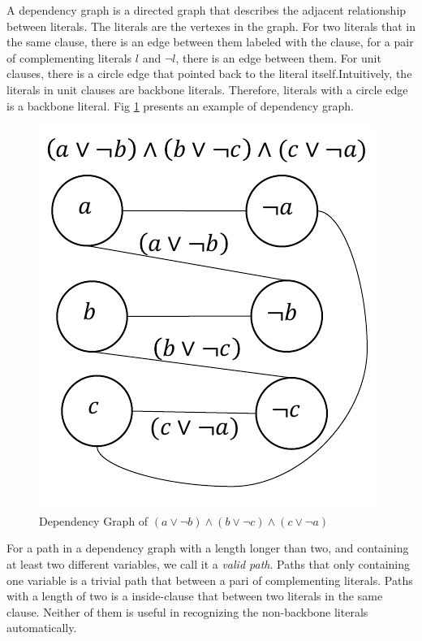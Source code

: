  A dependency graph is a directed graph that describes the adjacent relationship between literals. The literals are the vertexes in the graph. For two literals that in the same clause, there is an edge between them labeled with the clause, for a pair of complementing literals $l$ and $\neg l$, there is an edge between them. For unit clauses, there is a circle edge that pointed back to the literal itself.Intuitively, the literals in unit clauses are backbone literals. Therefore, literals with a circle edge is a backbone literal. Fig \ref{fig:depend} presents an example of dependency graph.
 \begin{figure}
    \centering
    \includegraphics[scale=0.7]{dpendency.pdf}
   \caption{Dependency Graph of $(a\vee\neg b)\wedge(b\vee\neg c)\wedge(c\vee\neg a)$}
   \label{fig:depend}
\end{figure}

 For a path in a dependency graph with a length longer than two, and containing at least two different variables, we call it a \emph{valid path}. Paths that only containing one variable is a trivial path that between a pari of complementing literals. Paths with a length of two is a inside-clause that between two literals in the same clause. Neither of them is useful in recognizing the non-backbone literals automatically.
 
